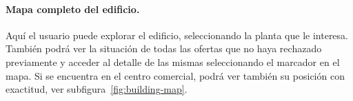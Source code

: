 \paragraph{Mapa completo del edificio.} Aquí el usuario puede explorar el edificio, seleccionando la planta que le interesa. También podrá ver la situación de todas las ofertas que no haya rechazado previamente y acceder al detalle de las mismas seleccionando el marcador en el mapa. Si se encuentra en el centro comercial, podrá ver también su posición con exactitud, ver subfigura~\ref{fig:building-map}.

\begin{figure}[tbp]
\centering
{}

\end{figure}
